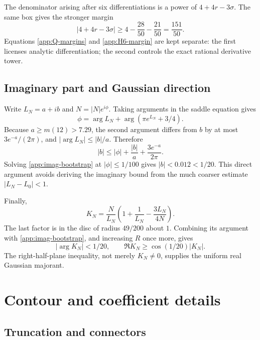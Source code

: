The denominator arising after six differentiations is a power of
$4+4r-3\sigma$.  The same box gives the stronger margin
\begin{equation}\label{app:H6-margin}
 |4+4r-3\sigma|\ge4-\frac{28}{50}-\frac{21}{50}
 =\frac{151}{50}.
\end{equation}
Equations \eqref{app:Q-margins} and \eqref{app:H6-margin} are kept separate:
the first licenses analytic differentiation; the second controls the exact
rational derivative tower.

\subsection{Imaginary part and Gaussian direction}

Write $L_N=a+ib$ and $N=|N|e^{i\phi}$.  Taking arguments in the saddle
equation gives
\[
 \phi=\arg L_N+\arg(\pi e^{L_N}+3/4).
\]
Because $a\ge m(12)>7.29$, the second argument differs from $b$ by at most
$3e^{-a}/(2\pi)$, and $|\arg L_N|\le |b|/a$.  Therefore
\begin{equation}\label{app:imag-bootstrap}
 |b|\le|\phi|+\frac{|b|}{a}+\frac{3e^{-a}}{2\pi}.
\end{equation}
Solving \eqref{app:imag-bootstrap} at $|\phi|\le1/100$ gives
$|b|<0.012<1/20$.  This direct argument avoids deriving the imaginary bound
from the much coarser estimate $|L_N-L_0|<1$.

Finally,
\[
 K_N=\frac{N}{L_N}
 \left(1+\frac1{L_N}-\frac{3L_N}{4N}\right).
\]
The last factor is in the disc of radius $49/200$ about $1$.  Combining its
argument with \eqref{app:imag-bootstrap}, and increasing $R$ once more,
gives
\begin{equation}\label{app:K-sector}
 |\arg K_N|<1/20,\qquad
 \Re K_N\ge\cos(1/20)|K_N|.
\end{equation}
The right-half-plane inequality, not merely $K_N\ne0$, supplies the uniform
real Gaussian majorant.

\section{Contour and coefficient details}\label{app:contour-details}

\subsection{Truncation and connectors}

